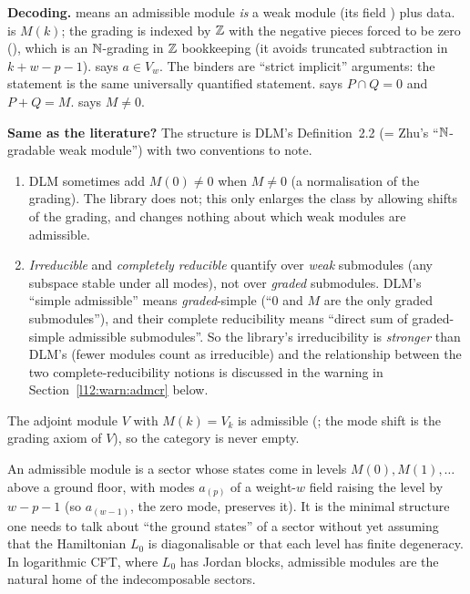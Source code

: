 \begin{dictionary}
\textbf{Decoding.}  means an admissible module \emph{is} a weak module
(its field ) plus data.  is $M(k)$; the grading is indexed by ${\mathbb{Z}}$ with
the negative pieces forced to be zero (), which is an ${\mathbb{N}}$-grading in ${\mathbb{Z}}$
bookkeeping (it avoids truncated subtraction in $k+w-p-1$).  says $a\in V_w$.
The binders  are ``strict implicit'' arguments: the statement is the same universally
quantified statement.  says $P\cap Q = 0$ and $P+Q = M$. 
says $M\neq0$.

\textbf{Same as the literature?} The structure is DLM's Definition~2.2 (= Zhu's ``${\mathbb{N}}$-gradable weak
module'') with two conventions to note.
\begin{enumerate}
\item DLM sometimes add $M(0)\neq0$ when $M\neq0$ (a normalisation of the grading). The library does
  not; this only enlarges the class by allowing shifts of the grading, and changes nothing about which
  weak modules are admissible.
\item \emph{Irreducible} and \emph{completely reducible} quantify over \emph{weak} submodules (any
  subspace stable under all modes), not over \emph{graded} submodules. DLM's ``simple admissible''
  means \emph{graded}-simple (``$0$ and $M$ are the only graded submodules''), and their complete
  reducibility means ``direct sum of graded-simple admissible submodules''. So the library's
  irreducibility is \emph{stronger} than DLM's (fewer modules count as irreducible) and the
  relationship between the two complete-reducibility notions is discussed in
  the warning in Section~\ref{l12:warn:admcr} below.
\end{enumerate}
The adjoint module $V$ with $M(k) = V_k$ is admissible (; the mode shift
is the grading axiom of $V$), so the category is never empty.
\end{dictionary}

\begin{physics}
An admissible module is a sector whose states come in levels $M(0),M(1),\dots$ above a ground floor, with modes
$a_{(p)}$ of a weight-$w$ field raising the level by $w-p-1$ (so $a_{(w-1)}$, the zero mode, preserves it). It
is the minimal structure one needs to talk about ``the ground states'' of a sector without yet assuming that
the Hamiltonian $L_0$ is diagonalisable or that each level has finite degeneracy. In logarithmic CFT, where
$L_0$ has Jordan blocks, admissible modules are the natural home of the indecomposable sectors.
\end{physics}

